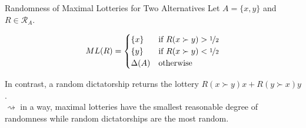 \documentclass{beamer}
\theoremstyle{definition}
\begin{document}
\begin{frame}{Randomness of Maximal Lotteries for Two Alternatives}
Let $A = \{x, y\}$ and $R \in \mathcal{R}_A$.\pause

\begin{align*}
    ML(R) = \begin{cases}
        \{x\} & \text{if } R(x \succ y) > \nicefrac{1}{2} \\
        \{y\} & \text{if } R(x \succ y) < \nicefrac{1}{2} \\
        \Delta(A) & \text{otherwise}
    \end{cases}
\end{align*}\pause

In contrast, a random dictatorship returns the lottery $R(x \succ y) x + R(y \succ x) y$.\pause \\ [10pt]

$\rightsquigarrow$ in a way, maximal lotteries have the smallest reasonable degree of randomness while random dictatorships are the most random.
\end{frame}
\end{document}
